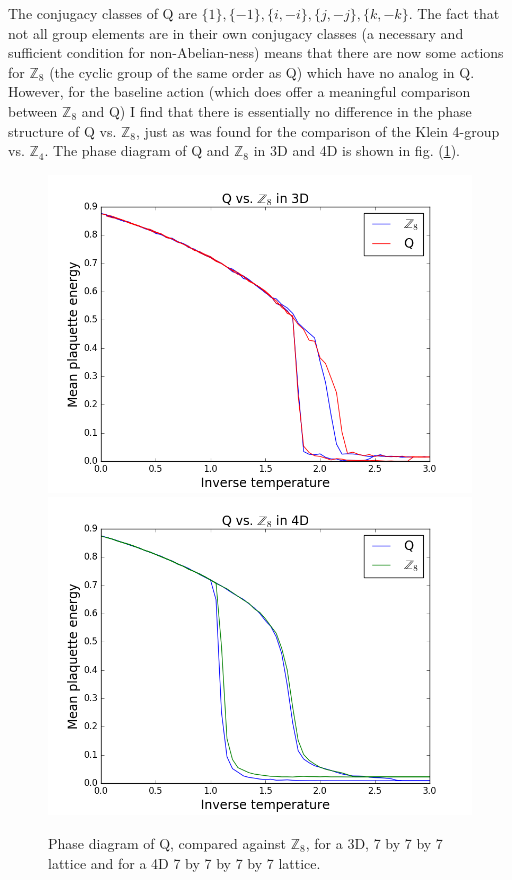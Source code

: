 \documentclass[9pt,twocolumn,twoside]{article}
\begin{document}
The conjugacy classes of Q are $\{1\},\{-1\},\{i,-i\},\{j,-j\},\{k,-k\}$.  The fact that not all group elements are in their own conjugacy classes (a necessary and sufficient condition for non-Abelian-ness) means that there are now some actions for $\mathbb{Z}_8$ (the cyclic group of the same order as Q) which have no analog in Q.  However, for the baseline action (which does offer a meaningful comparison between $\mathbb{Z}_8$ and Q) I find that there is essentially no difference in the phase structure of Q vs. $\mathbb{Z}_8$, just as was found for the comparison of the Klein 4-group vs. $\mathbb{Z}_4$.  The phase diagram of Q and $\mathbb{Z}_8$ in 3D and 4D is shown in fig. (\ref{qvz8}). 

\begin{figure}[h!]
	\begin{centering}
	\includegraphics[width=\columnwidth]{qvz8,3d}
	\includegraphics[width=\columnwidth]{qvz8,4d}
	\caption{Phase diagram of Q, compared against $\mathbb{Z}_8$, for a 3D, 7 by 7 by 7 lattice and for a 4D 7 by 7 by 7 by 7 lattice.}
	\label{qvz8}
	\end{centering}
\end{figure}
\end{document}
